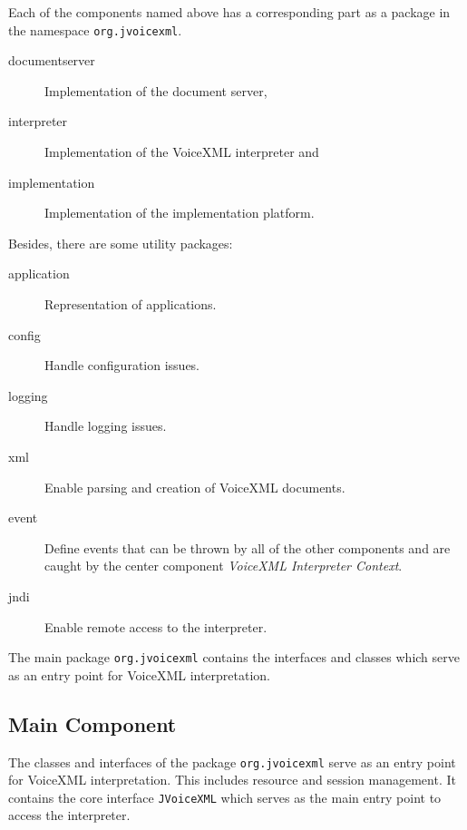 \documentclass[11pt,a4paper]{article}
\begin{document}
Each of the components named above has a corresponding part as a package in the
namespace \texttt{org.jvoicexml}. 
\begin{description}
\item[documentserver] Implementation of the document server,
\item[interpreter] Implementation of the VoiceXML interpreter and
\item[implementation] Implementation of the implementation 
platform.
\end{description}

Besides, there are some utility packages:
\begin{description}
\item[application] Representation of applications.
\item[config] Handle configuration issues.
\item[logging] Handle logging issues.
\item[xml] Enable parsing and creation of VoiceXML documents.
\item[event] Define events that can be thrown by all of the 
other components and are caught by the center component \emph{VoiceXML
Interpreter Context}.
\item[jndi] Enable remote access to the interpreter.
\end{description}

The main package \texttt{org.jvoicexml} contains the interfaces and classes
which serve as an entry point for VoiceXML interpretation.

\subsection{Main Component}
\label{sec:main-component}

The classes and interfaces of the package \texttt{org.jvoicexml} serve as an
entry point for VoiceXML interpretation. This includes resource and session
management.
It contains the core interface \texttt{JVoiceXML} which serves
as the main entry point to access the interpreter. 
\end{document}
